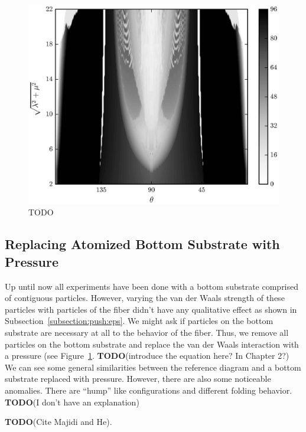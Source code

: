 	\begin{figure}[t]
		\begin{center}
			\includegraphics{./fig/ch3/push/p1/grid.eps}
		\end{center}		
		\caption{ TODO
		\label{fig:PushGrid:p1}}
	\end{figure}

\subsection{Replacing Atomized Bottom Substrate with Pressure}

Up until now all experiments have been done with a bottom substrate comprised of contiguous particles. However, varying the van der Waals strength of these particles with particles of the fiber didn't have any qualitative effect as shown in Subsection~\ref{subsection:push:eps}. We might ask if particles on the bottom substrate are necessary at all to the behavior of the fiber. Thus, we remove all particles on the bottom substrate and replace the van der Waals interaction with a pressure (see Figure~\ref{fig:PushGrid:p1}. \textbf{TODO}(introduce the equation here? In Chapter 2?) We can see some general similarities between the reference diagram and a bottom substrate replaced with pressure. However, there are also some noticeable anomalies. There are ``hump'' like configurations and different folding behavior. \textbf{TODO}(I don't have an explanation)

\textbf{TODO}(Cite Majidi and He).

